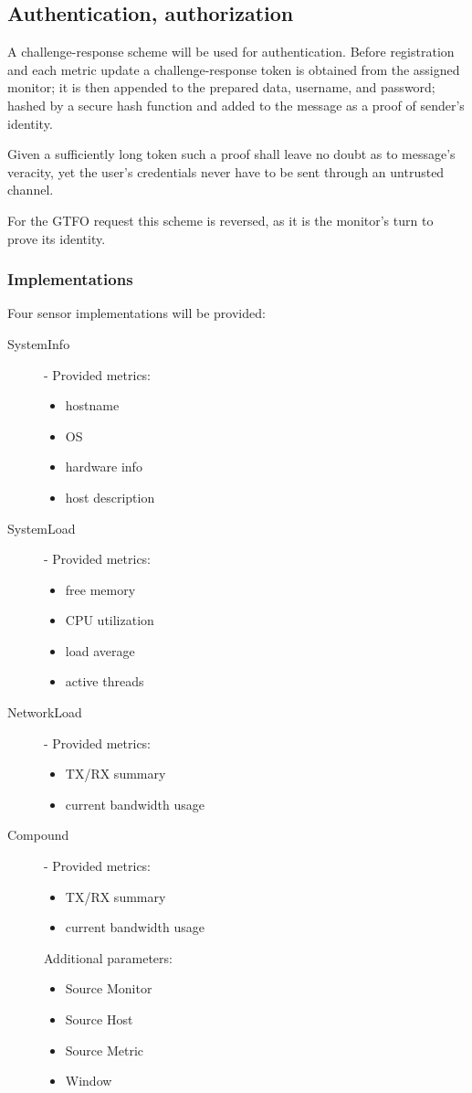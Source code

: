 \documentclass[a4paper]{article}
\begin{document}
\subsection{Authentication, authorization}
A challenge-response scheme will be used for authentication.
Before registration and each metric update a challenge-response token is obtained from the assigned monitor; it is then appended to the prepared data, username, and password; hashed by a secure hash function and added to the message as a proof of sender's identity.

Given a sufficiently long token such a proof shall leave no doubt as to message's veracity, yet the user's credentials never have to be sent through an untrusted channel.

For the GTFO request this scheme is reversed, as it is the monitor's turn to prove its identity.
\subsubsection{Implementations}
Four sensor implementations will be provided:
\begin{description}
\item[SystemInfo] - 
	Provided metrics:
	\begin{itemize}
		\item hostname
		\item OS
		\item hardware info
		\item host description
	\end{itemize}
\item[SystemLoad] - 
	Provided metrics:
	\begin{itemize}
		\item free memory
		\item CPU utilization
		\item load average
		\item active threads
	\end{itemize}
\item[NetworkLoad] - 
	Provided metrics:
	\begin{itemize}
		\item TX/RX summary
		\item current bandwidth usage
	\end{itemize}
\item[Compound] - 
	Provided metrics:
	\begin{itemize}
		\item TX/RX summary
		\item current bandwidth usage
	\end{itemize}
	Additional parameters:
	\begin{itemize}
		\item Source Monitor
		\item Source Host
		\item Source Metric
		\item Window
	\end{itemize}
\end{description}
\end{document}

